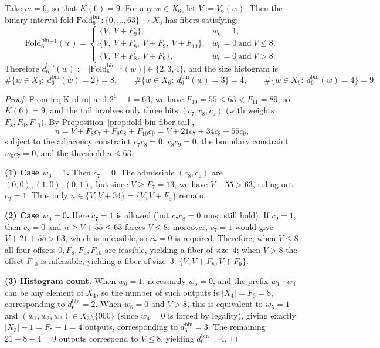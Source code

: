 \begin{corollary}[Explicit fiber classification and rigid histogram for \texorpdfstring{$m=6$}{m=6}]\label{cor:fold-bin-m6-fiber-hist}
Take \(m=6\), so that \(K(6)=9\). For any \(w\in X_6\), let \(V:=V_6(w)\).
Then the binary interval fold \(\mathrm{Fold}^{\mathrm{bin}}_6:\{0,\dots,63\}\to X_6\) has fibers satisfying:
\[
\mathrm{Fold}^{\mathrm{bin}}_6{}^{-1}(w)=
\begin{cases}
\{V,\ V+F_{9}\}, & w_6=1,\\[4pt]
\{V,\ V+F_{8},\ V+F_{9},\ V+F_{10}\}, & w_6=0\ \text{and}\ V\le 8,\\[4pt]
\{V,\ V+F_{8},\ V+F_{9}\}, & w_6=0\ \text{and}\ V> 8.
\end{cases}
\]
Therefore \(d^{\mathrm{bin}}_6(w):=\bigl|\mathrm{Fold}^{\mathrm{bin}}_6{}^{-1}(w)\bigr|\in\{2,3,4\}\), and the size histogram is
\[
\#\{w\in X_6:\ d^{\mathrm{bin}}_6(w)=2\}=8,\qquad
\#\{w\in X_6:\ d^{\mathrm{bin}}_6(w)=3\}=4,\qquad
\#\{w\in X_6:\ d^{\mathrm{bin}}_6(w)=4\}=9.
\]
\end{corollary}
\begin{proof}
From \eqref{eq:K-of-m} and \(2^6-1=63\), we have \(F_{10}=55\le 63<F_{11}=89\), so \(K(6)=9\), and the tail involves only three bits \((c_7,c_8,c_9)\) (with weights \(F_8,F_9,F_{10}\)).
By Proposition~\ref{prop:fold-bin-fiber-tail},
\[
n=V+F_8c_7+F_9c_8+F_{10}c_9
=V+21c_7+34c_8+55c_9,
\]
subject to the adjacency constraint \(c_7c_8=0\), \(c_8c_9=0\), the boundary constraint \(w_6c_7=0\), and the threshold \(n\le 63\).
\par
\noindent\textbf{(1) Case \(w_6=1\).} Then \(c_7=0\).
The admissible \((c_8,c_9)\) are \((0,0),(1,0),(0,1)\), but since \(V\ge F_7=13\), we have \(V+55>63\), ruling out \(c_9=1\).
Thus only \(n\in\{V,V+34\}=\{V,V+F_9\}\) remain.
\par
\noindent\textbf{(2) Case \(w_6=0\).} Here \(c_7=1\) is allowed (but \(c_7c_8=0\) must still hold).
If \(c_9=1\), then \(c_8=0\) and \(n\ge V+55\le 63\) forces \(V\le 8\); moreover, \(c_7=1\) would give \(V+21+55>63\), which is infeasible, so \(c_7=0\) is required.
Therefore, when \(V\le 8\) all four offsets \(0,F_8,F_9,F_{10}\) are feasible, yielding a fiber of size~\(4\);
when \(V>8\) the offset \(F_{10}\) is infeasible, yielding a fiber of size~\(3\): \(\{V,V+F_8,V+F_9\}\).
\par
\noindent\textbf{(3) Histogram count.}
When \(w_6=1\), necessarily \(w_5=0\), and the prefix \(w_1\cdots w_4\) can be any element of \(X_4\), so the number of such outputs is \(|X_4|=F_6=8\), corresponding to \(d^{\mathrm{bin}}_6=2\).
When \(w_6=0\) and \(V>8\), this is equivalent to \(w_5=1\) and \((w_1,w_2,w_3)\in X_3\setminus\{000\}\) (since \(w_4=0\) is forced by legality), giving exactly \(|X_3|-1=F_5-1=4\) outputs, corresponding to \(d^{\mathrm{bin}}_6=3\).
The remaining \(21-8-4=9\) outputs correspond to \(V\le 8\), yielding \(d^{\mathrm{bin}}_6=4\).
\end{proof}

